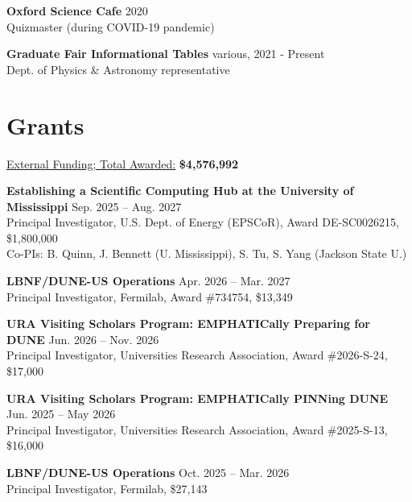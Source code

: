 \documentclass[margin, line]{res}
\renewcommand{\em}{\upshape\sffamily}
\begin{document}
\begin{resume}
{\bf Oxford Science Cafe} \hfill {2020}\\
{\em Quizmaster (during COVID-19 pandemic)}\\
\vspace{-.3cm}

{\bf Graduate Fair Informational Tables} \hfill {various, 2021 - Present}\\
{\em Dept. of Physics \& Astronomy representative}\\
\vspace{-.3cm}

\section{\sc Grants}

\underline{\em External Funding; Total Awarded:} \textbf{\$4,576,992}

{\bf Establishing a Scientific Computing Hub at the University of Mississippi} \hfill {Sep. 2025 -- Aug. 2027}\\
{\em Principal Investigator}, U.S. Dept. of Energy (EPSCoR), Award DE-SC0026215, \$1,800,000\\
{\em Co-PIs: B. Quinn, J. Bennett (U. Mississippi), S. Tu, S. Yang (Jackson State U.)}\\
\vspace{-.3cm}

{\bf LBNF/DUNE-US Operations} \hfill {Apr. 2026 -- Mar. 2027}\\
{\em Principal Investigator}, Fermilab, Award \#734754, \$13,349\\
\vspace{-.3cm}

{\bf URA Visiting Scholars Program: EMPHATICally Preparing for DUNE} \hfill {Jun. 2026 -- Nov. 2026}\\
{\em Principal Investigator}, Universities Research Association, Award \#2026-S-24, \$17,000\\
\vspace{-.3cm}

{\bf URA Visiting Scholars Program: EMPHATICally PINNing DUNE} \hfill {Jun. 2025 -- May 2026}\\
{\em Principal Investigator}, Universities Research Association, Award \#2025-S-13, \$16,000\\
\vspace{-.3cm}

{\bf LBNF/DUNE-US Operations} \hfill {Oct. 2025 -- Mar. 2026}\\
{\em Principal Investigator}, Fermilab, \$27,143\\
\vspace{-.3cm}


\end{resume}
\end{document}
